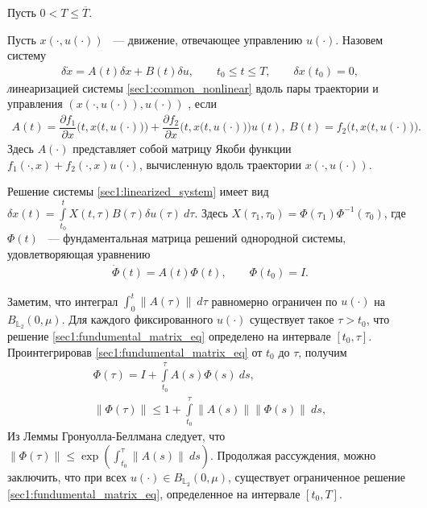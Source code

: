 \documentclass[../main.tex]{subfiles}
\begin{document}
Пусть $ 0 <  T \leqslant \overline{T} $.
\begin{definition}\label{sec1:def:linearized_system}
    Пусть $ x(\cdot,u(\cdot)) $ ~--- движение, отвечающее управлению $ u(\cdot)$.
    Назовем систему
    \begin{gather}\label{sec1:linearized_system}
        \delta \dot{x} =  A(t) \delta x + B(t) \delta u, \qquad t_0 \leqslant t \leqslant T, \qquad \delta x(t_0) = 0,
    \end{gather}
    {\textit линеаризацией} системы \eqref{sec1:common_nonlinear} вдоль пары траектории и управления $\left( x(\cdot,u(\cdot)),u(\cdot)\right)   $ , если 
    \begin{gather*}
        A(t) = \dfrac{\partial f_1}{\partial x} \Big(t,x\big(t,u(\cdot)\big)\Big) + \dfrac{\partial f_2}{\partial x}\Big(t,x\big(t,u(\cdot)\big)\Big) u(t), \  
        B(t) = f_2 \Big(t,x\big(t,u(\cdot)\big)\Big).
    \end{gather*}
    Здесь $ A(\cdot) $ представляет собой матрицу Якоби функции $ f_1(\cdot, x) + f_2(\cdot, x) u(\cdot) $, вычисленную вдоль траектории $ x(\cdot,u(\cdot)) $.
\end{definition}
Решение системы \eqref{sec1:linearized_system} имеет вид $\delta x(t) =  \int\limits_{t_0}^{t} X(t, \tau) B(\tau) \delta u(\tau) \ d\tau $.
Здесь $ X(\tau_1,\tau_0)= \Phi(\tau_1) \Phi^{-1}(\tau_0) $, где $\Phi(t) $ ~--- фундаментальная матрица решений однородной системы, удовлетворяющая уравнению 
\begin{gather}\label{sec1:fundumental_matrix_eq}
    \dot{\Phi}(t) = A(t) \Phi(t), \qquad \Phi(t_0) = I.
\end{gather}
    
Заметим, что интеграл $\int_0^t \| A(\tau)\|  \ d\tau$ равномерно ограничен по $u(\cdot) $ на $  B_{\mathbb{L}_2}(0,\mu)$.
Для каждого фиксированного  $u(\cdot) $ существует такое $\tau > t_0$, что решение \eqref{sec1:fundumental_matrix_eq} определено на интервале $ [t_0, \tau] $.
Проинтегрировав \eqref{sec1:fundumental_matrix_eq} от $t_0$ до $\tau$, получим
\begin{gather*}
    \Phi(\tau) = I + \int\limits_{t_0}^{\tau} A(s)  \Phi(s) \ ds, \\
    \| \Phi(\tau) \| \leqslant 1 +  \int\limits_{t_0}^{\tau} \| A(s)\| \|\Phi(s)\| \ ds,
\end{gather*}
Из Леммы Гронуолла-Беллмана \cite{Bellman} следует, что  $ \| \Phi(\tau) \| \leqslant \exp \left( \int_{t_0}^{\tau}  \| A(s)\| \ ds \right)$.
Продолжая рассуждения, можно заключить,  что при всех $u(\cdot) \in  B_{\mathbb{L}_2}(0,\mu)$, существует ограниченное решение  \eqref{sec1:fundumental_matrix_eq}, определенное на интервале $[t_0, T]$.
    
\end{document}
